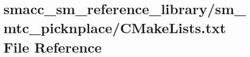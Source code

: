 \hypertarget{sm__reference__library_2sm__mtc__picknplace_2CMakeLists_8txt}{}\section{smacc\+\_\+sm\+\_\+reference\+\_\+library/sm\+\_\+mtc\+\_\+picknplace/\+C\+Make\+Lists.txt File Reference}
\label{sm__reference__library_2sm__mtc__picknplace_2CMakeLists_8txt}
